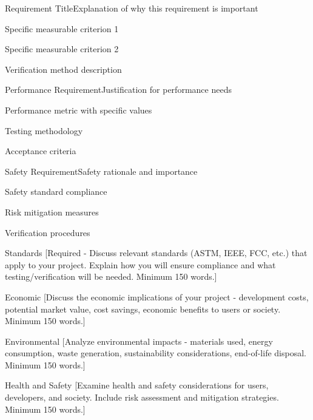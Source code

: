 \documentclass[final]{designreport}
\begin{document}
\engineeringreqs

\begin{engineeringreq}{1}{Requirement Title}{Explanation of why this requirement is important}
    \item Specific measurable criterion 1
    \item Specific measurable criterion 2
    \item Verification method description
\end{engineeringreq}

\begin{engineeringreq}{2}{Performance Requirement}{Justification for performance needs}
    \item Performance metric with specific values
    \item Testing methodology
    \item Acceptance criteria
\end{engineeringreq}

\begin{engineeringreq}{3}{Safety Requirement}{Safety rationale and importance}
    \item Safety standard compliance
    \item Risk mitigation measures
    \item Verification procedures
\end{engineeringreq}

\impactstatements

\begin{impactstatement}{Standards}
[Required - Discuss relevant standards (ASTM, IEEE, FCC, etc.) that apply to your project. Explain how you will ensure compliance and what testing/verification will be needed. Minimum 150 words.]
\end{impactstatement}

\begin{impactstatement}{Economic}
[Discuss the economic implications of your project - development costs, potential market value, cost savings, economic benefits to users or society. Minimum 150 words.]
\end{impactstatement}

\begin{impactstatement}{Environmental}
[Analyze environmental impacts - materials used, energy consumption, waste generation, sustainability considerations, end-of-life disposal. Minimum 150 words.]
\end{impactstatement}

\begin{impactstatement}{Health and Safety}
[Examine health and safety considerations for users, developers, and society. Include risk assessment and mitigation strategies. Minimum 150 words.]
\end{impactstatement}
\end{document}
